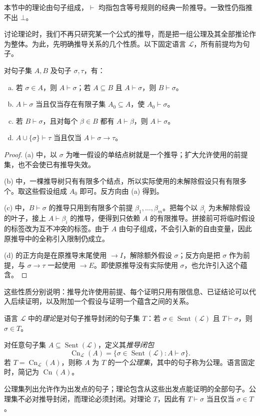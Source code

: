 \documentclass[lang=cn,a4paper,fontset=none,zihao=false,10pt,openany,twoside]{beautybook}
\numberwithin{algorithm}{chapter}
\begin{document}
本节中的理论由句子组成，$\vdash$ 均指包含等号规则的经典一阶推导。一致性仍指推不出 $\bot$。

讨论理论时，我们不再只研究某一个公式的推导，而是把一组公理及其全部推论作为整体。为此，先明确推导关系的几个性质。以下固定语言 $\mathcal L$，所有前提均为句子。

\begin{lemma}[有限证明与推导的复合]\label{lem:sentence-derivation}
对句子集 $A,B$ 及句子 $\sigma,\tau$，有：
\begin{enumerate}[(a)]
\item 若 $\sigma\in A$，则 $A\vdash\sigma$；若 $A\subseteq B$ 且 $A\vdash\sigma$，则 $B\vdash\sigma$。
\item $A\vdash\sigma$ 当且仅当存在有限子集 $A_0\subseteq A$，使 $A_0\vdash\sigma$。
\item 若 $B\vdash\sigma$，且对每个 $\beta\in B$ 都有 $A\vdash\beta$，则 $A\vdash\sigma$。
\item $A\cup\{\sigma\}\vdash\tau$ 当且仅当 $A\vdash\sigma\to\tau$。
\end{enumerate}
\end{lemma}
\begin{proof}
(a) 中，以 $\sigma$ 为唯一假设的单结点树就是一个推导；扩大允许使用的前提集，也不会使已有推导失效。

(b) 中，一棵推导树只有有限多个结点，所以实际使用的未解除假设只有有限多个。取这些假设组成 $A_0$ 即可。反方向由 (a) 得到。

(c) 中，$B\vdash\sigma$ 的推导只用到有限多个前提 $\beta_1,\ldots,\beta_m$。把每个以 $\beta_i$ 为未解除假设的叶子，接上 $A\vdash\beta_i$ 的推导，便得到只依赖 $A$ 的有限推导。拼接前可将临时假设的标签改为互不冲突的标签。由于 $A$ 由句子组成，不会引入新的自由变量，因此原推导中的全称引入限制仍成立。

(d) 的正方向是在原推导末尾使用 $\to I$，解除额外假设 $\sigma$；反方向是把 $\sigma$ 作为前提，与 $\sigma\to\tau$ 一起使用 $\to E$。即使原推导没有实际使用 $\sigma$，也允许引入这个蕴含。
\end{proof}
这些性质分别说明：推导允许使用前提、每个证明只用有限信息、已证结论可以代入后续证明，以及附加一个假设与证明一个蕴含之间的关系。

\begin{definition}[理论、公理集与推导闭包]\label{def:theory}
语言 $\mathcal L$ 中的\emph{理论}是对句子推导封闭的句子集 $T$：若 $\sigma\in\operatorname{Sent}(\mathcal L)$ 且 $T\vdash\sigma$，则 $\sigma\in T$。

对任意句子集 $A\subseteq\operatorname{Sent}(\mathcal L)$，定义其\emph{推导闭包}
\[
 \operatorname{Cn}_{\mathcal L}(A)
 =\{\sigma\in\operatorname{Sent}(\mathcal L):A\vdash\sigma\}.
\]
若 $T=\operatorname{Cn}_{\mathcal L}(A)$，则称 $A$ 为 $T$ 的一个\emph{公理集}，其中的句子称为公理。语言固定时，简记为 $\operatorname{Cn}(A)$。
\end{definition}
公理集列出允许作为出发点的句子；理论包含从这些出发点能证明的全部句子。公理集不必对推导封闭，而理论必须封闭。对理论 $T$，因此有 $T\vdash\sigma$ 当且仅当 $\sigma\in T$。
\end{document}
